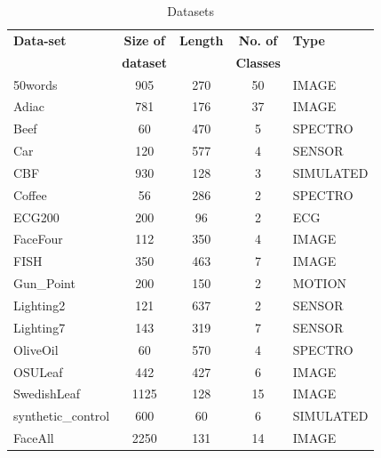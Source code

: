 \begin{table}[ht]
\centering
\small
\begin{tabular}{lcccl}
\textbf{Data-set}   & \textbf{Size of  } & \textbf{Length} & \textbf{No. of  } & \textbf{Type} \\
\textbf{ }   & \textbf{  dataset} & \textbf{ } & \textbf{  Classes} & \textbf{ } \\
50words            & 905                      & 270             & 50                      & IMAGE         \\
Adiac              & 781                      & 176             & 37                      & IMAGE         \\
Beef               & 60                       & 470             & 5                       & SPECTRO       \\
Car                & 120                      & 577             & 4                       & SENSOR        \\
CBF                & 930                      & 128             & 3                       & SIMULATED     \\
Coffee             & 56                       & 286             & 2                       & SPECTRO       \\
ECG200             & 200                      & 96              & 2                       & ECG           \\
FaceFour           & 112                      & 350             & 4                       & IMAGE         \\
FISH               & 350                      & 463             & 7                       & IMAGE         \\
Gun\_Point         & 200                      & 150             & 2                       & MOTION        \\
Lighting2          & 121                      & 637             & 2                       & SENSOR        \\
Lighting7          & 143                      & 319             & 7                       & SENSOR        \\
OliveOil           & 60                       & 570             & 4                       & SPECTRO       \\
OSULeaf            & 442                      & 427             & 6                       & IMAGE         \\
SwedishLeaf        & 1125                     & 128             & 15                      & IMAGE         \\
synthetic\_control & 600                      & 60              & 6                       & SIMULATED     \\
FaceAll            & 2250                     & 131             & 14                      & IMAGE        
\end{tabular}
\caption{Datasets}
\label{datasets}
\end{table}

